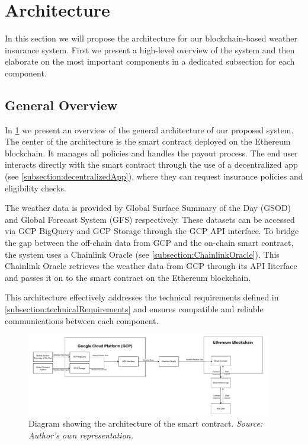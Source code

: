 \section{Architecture}

In this section we will propose the architecture for our blockchain-based weather insurance system. First we present a high-level overview of the system and then elaborate on the most important components in a dedicated subsection for each component.

\subsection{General Overview}\label{subsection:generalOverview}

In \cref{fig:generalArchitecture} we present an overview of the general architecture of our proposed system. The center of the architecture is the smart contract deployed on the Ethereum blockchain. It manages all policies and handles the payout process. The end user interacts directly with the smart contract through the use of a decentralized app (see \cref{subsection:decentralizedApp}), where they can request insurance policies and eligibility checks.

The weather data is provided by Global Surface Summary of the Day (GSOD) and Global Forecast System (GFS) respectively. These datasets can be accessed via GCP BigQuery and GCP Storage through the GCP API interface. To bridge the gap between the off-chain data from GCP and the on-chain smart contract, the system uses a Chainlink Oracle (see \cref{subsection:ChainlinkOracle}). This Chainlink Oracle retrieves the weather data from GCP through its API Iiterface and passes it on to the smart contract on the Ethereum blockchain.

This architecture effectively addresses the technical requirements defined in \cref{subsection:technicalRequirements} and ensures compatible and reliable communications between each component.

\begin{figure}[h]
    \centering
    \includegraphics[width=0.95\textwidth]{figures/architecture-overview.drawio.pdf}
    \caption{Diagram showing the architecture of the smart contract. \textit{Source: Author's own representation.}}
    \label{fig:generalArchitecture}
\end{figure}

